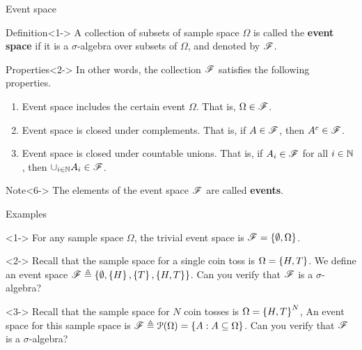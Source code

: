 \documentclass[12pt,aspectratio=169]{beamer}
\begin{document}
\begin{frame}{Event space}
    \begin{block}{Definition}<1->
    A collection of subsets of sample space $\Omega$ is called the \textbf{event space} if it is a $\sigma$-algebra over subsets of $\Omega$, and denoted by $\mathscr{F}$. 
    \end{block}
    \begin{block}{Properties}<2->
        In other words, the collection $\mathscr{F}$ satisfies the following properties. 
        \begin{enumerate}
            \item<3-> Event space includes the certain event $\Omega$. That is, $\Omega \in \mathscr{F}$. 
            \item<4-> Event space is closed under complements. That is, if $A \in \mathscr{F}$, then $A^c \in \mathscr{F}$. 
            \item<5-> Event space is closed under countable unions. That is, if $A_i \in \mathscr{F}$ for all $i \in \mathbb{N}$, then $\cup_{i \in \mathbb{N}}A_i \in \mathscr{F}$.
        \end{enumerate}
    \end{block}
    \begin{block}{Note}<6->
        The elements of the event space $\mathscr{F}$ are called \textbf{events}. 
    \end{block}
\end{frame}

\begin{frame}{Examples}
    \begin{Example}<1->
        For any sample space $\Omega$, the trivial event space is $\mathscr{F} = \left\{\emptyset, \Omega\right\}$. 
    \end{Example}
    \begin{Example}<2-> 
        Recall that the sample space for a single coin toss is $\Omega = \left\{H, T\right\}$. We define an event space $\mathscr{F} \triangleq \left\{\emptyset, \left\{H\right\}, \left\{T\right\}, \left\{H,T\right\}\right\}$. Can you verify that $\mathscr{F}$ is a $\sigma$-algebra?
    \end{Example}
    \begin{Example}<3-> 
        Recall that the sample space for $N$ coin tosses is $\Omega = \left\{H, T\right\}^N$, 
        An event space for this sample space is $\mathscr{F} \triangleq \mathcal{P}(\Omega) = \left\{A: A \subseteq \Omega\right\}$. Can you verify that $\mathscr{F}$ is a $\sigma$-algebra?
    \end{Example}
\end{frame}
\end{document}
